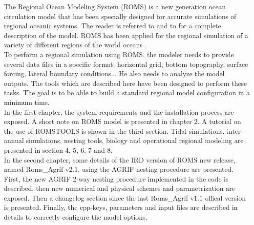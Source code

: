 

The Regional Ocean Modeling System (ROMS) is a new generation ocean circulation model
\citep{Shc03b} that has been specially designed for accurate simulations of regional
oceanic systems.  The reader is referred to \citet{Shc03a} and to \citet{Shc03b} for
a complete description of the model.  ROMS has been applied for the regional
simulation of a variety of different regions of the world oceans
\citep[e.g.][]{Bla02,Dil03,Hai00,Mac02,Mar03,Pen01}. \\

To perform a regional simulation using ROMS, the modeler needs to provide several
data files in a specific format: horizontal grid, bottom topography, surface forcing,
lateral boundary conditions... He also needs to analyze the model outputs. The tools
which are described here have been designed to perform these tasks.  The goal is to
be able to build a standard regional model configuration in a minimum time. \\

In the first chapter, the system requirements and the installation process are
exposed. A short note on ROMS model is presented in chapter 2. A tutorial on the use
of ROMSTOOLS is shown in the third section. Tidal simulations, inter-annual
simulations, nesting tools, biology and operational regional modeling are presented
in section 4,
5, 6, 7 and 8. \\

In the second chapter, some details of the IRD version of ROMS new release, named
Roms\_Agrif v$2.1$, using the AGRIF nesting procedure are presented. \\
First, the new AGRIF 2-way nesting procedure implemented in the code is described,
then new numerical and physical schemes and parametrization are exposed. Then a
changelog section since the last Roms\_Agrif v$1.1$ offical version is presented.
Finally, the cpp-keys, parameters and input files are described in details to
correctly configure the model options.

